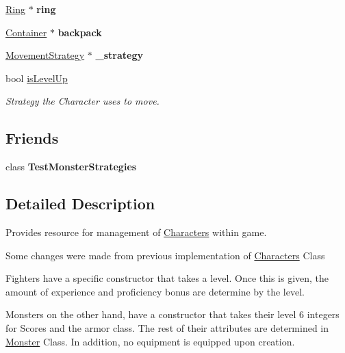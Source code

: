 \begin{DoxyCompactItemize}
\hyperlink{class_ring}{Ring} $\ast$ {\bfseries ring}
\item 
\hypertarget{class_characters_adf846a705a8a0641248e601c87c25403}{}\label{class_characters_adf846a705a8a0641248e601c87c25403} 
\hyperlink{class_container}{Container} $\ast$ {\bfseries backpack}
\item 
\hypertarget{class_characters_acd9ea9b263752c20bea91d3a7c4ed8db}{}\label{class_characters_acd9ea9b263752c20bea91d3a7c4ed8db} 
\hyperlink{class_movement_strategy}{Movement\+Strategy} $\ast$ {\bfseries \+\_\+strategy}
\item 
\hypertarget{class_characters_a9aa6aaad9efeee2713ebb94db9f9b63e}{}\label{class_characters_a9aa6aaad9efeee2713ebb94db9f9b63e} 
bool \hyperlink{class_characters_a9aa6aaad9efeee2713ebb94db9f9b63e}{is\+Level\+Up}
\begin{DoxyCompactList}\small\item\em Strategy the Character uses to move. \end{DoxyCompactList}\end{DoxyCompactItemize}
\subsection*{Friends}
\begin{DoxyCompactItemize}
\item 
\hypertarget{class_characters_a718f64183332e896211a2eaf90cdd989}{}\label{class_characters_a718f64183332e896211a2eaf90cdd989} 
class {\bfseries Test\+Monster\+Strategies}
\end{DoxyCompactItemize}


\subsection{Detailed Description}
Provides resource for management of \hyperlink{class_characters}{Characters} within game. 

Some changes were made from previous implementation of \hyperlink{class_characters}{Characters} Class

Fighters have a specific constructor that takes a level. Once this is given, the amount of experience and proficiency bonus are determine by the level.

Monsters on the other hand, have a constructor that takes their level 6 integers for Scores and the armor class. The rest of their attributes are determined in \hyperlink{class_monster}{Monster} Class. In addition, no equipment is equipped upon creation.

